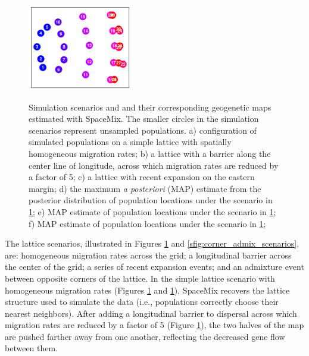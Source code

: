\documentclass[12pt]{article}
\begin{document}
\begin{figure}
			{\includegraphics[width=1.8in,height=1.5in]{figs/sims/GeoGenMap_expansion.pdf}}

	\caption{
    Simulation scenarios and and their corresponding geogenetic maps estimated with SpaceMix.  
    The smaller circles in the simulation scenarios represent unsampled populations.  
    a) configuration of simulated populations on a simple lattice with spatially homogeneous migration rates; 
    b) a lattice with a barrier along the center line of longitude, across which migration rates are reduced by a factor of 5; 
    c) a lattice with recent expansion on the eastern margin; 
    d) the maximum \textit{a posteriori} (MAP) estimate from the posterior distribution of population locations under the scenario in \ref{sfig:lattice_scenarios}; %
    e) MAP estimate of population locations under the scenario in \ref{sfig:lattice_scenarios}; %
    f) MAP estimate of population locations under the scenario in \ref{sfig:lattice_scenarios}; %
    }\label{sfig:lattice_scenarios}
\end{figure}

The lattice scenarios, illustrated in Figures \ref{sfig:lattice_scenarios} and \ref{sfig:corner_admix_scenarios}, are: 
homogeneous migration rates across the grid; a longitudinal barrier across the center of the grid; a series of recent expansion events; and an admixture event between opposite corners of the lattice.  In the simple lattice scenario with homogeneous migration rates (Figures \ref{sfig:lattice_scenarios} and \ref{sfig:lattice_scenarios}), SpaceMix recovers the lattice structure used to simulate the data (i.e., populations correctly choose their nearest neighbors).  
After adding a longitudinal barrier to dispersal across which migration rates are reduced by a factor of 5 (Figure \ref{sfig:lattice_scenarios}), 
the two halves of the map are pushed farther away from one another, 
reflecting the decreased gene flow between them.
\end{document}
